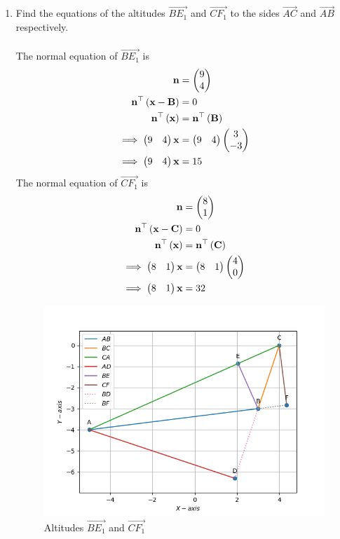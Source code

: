 \documentclass[10pt]{book}
\begin{document}
\begin{enumerate}[label=\thesection.\arabic*.,ref=\thesection.\theenumi]
\item Find the equations of the altitudes $\vec{BE_1}$ and $\vec{CF_1}$ to the sides $\vec{AC}$ and $\vec{AB}$ respectively.\\
\solution\\
The normal equation of $\vec{BE_1}$ is 
\begin{align}
\mathbf{n} &= \begin{pmatrix}9 \\ 4\end{pmatrix}\\
\mathbf{n}^{\top}\left(\mathbf{x} - \mathbf{B}\right) & = 0 \\
\mathbf{n}^{\top} \left(\mathbf{x}\right) & = \mathbf{n}^{\top} \left(\mathbf{B}\right) \\
	\implies \begin{pmatrix}9 & 4 \end{pmatrix}\mathbf{x} & = \begin{pmatrix}9 & 4\end{pmatrix} \begin{pmatrix}3 \\ -3\end{pmatrix}\\
	\implies \begin{pmatrix}9 & 4\end{pmatrix}\mathbf{x} & = 15
\end{align}
The normal equation of $\vec{CF_1}$ is 
\begin{align}
\mathbf{n} &= \begin{pmatrix}8 \\ 1\end{pmatrix} \\
\mathbf{n}^{\top}\left(\mathbf{x}-\mathbf{C}\right) &= 0\\
\mathbf{n}^{\top}\left(\mathbf{x}\right) &= \mathbf{n}^{\top}\left(\mathbf{C}\right) \\
\implies \begin{pmatrix}8 & 1\end{pmatrix}{\mathbf{x}} &= \begin{pmatrix}8 & 1\end{pmatrix} \begin{pmatrix}4 \\ 0\end{pmatrix}  \\
	\implies \begin{pmatrix}8 & 1\end{pmatrix}\mathbf{x} &= 32
\end{align}
\begin{figure}[H]
\includegraphics[width=\columnwidth]{figs/BECF_altitudes.png}
\caption{Altitudes $\vec{BE_1}$ and $\vec{CF_1}$ }
\label{fig:Line BE and CF}
\end{figure}


\end{enumerate}
\end{document}
